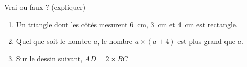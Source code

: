
\begin{exercice}\label{exo2smath-0154}

    Vrai ou faux ? (expliquer)
    \begin{enumerate}
        \item
            Un triangle dont les côtés mesurent \SI{6}{\centi\meter}, \SI{3}{\centi\meter} et \SI{4}{\centi\meter} est rectangle.
        \item
            Quel que soit le nombre \( a\), le nombre \( a\times (a+4)\) est plus grand que \( a\).
        \item
            Sur le dessin suivant, \( AD=2\times BC\) 

\begin{center}
   
\end{center}


    \end{enumerate}

\end{exercice}
